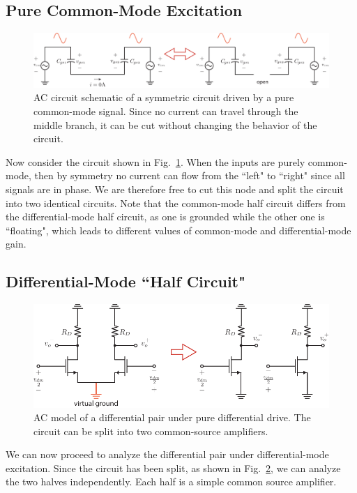 \subsection{Pure Common-Mode Excitation}
\begin{figure}[tb]
\centering
\includegraphics[width=\columnwidth]{CM_model.pdf}
\caption{AC circuit schematic of a symmetric circuit driven by a pure common-mode signal.  Since no current can travel through the middle branch, it can be cut without changing the behavior of the circuit.}
\label{fig:CM_model.pdf}
\end{figure}
Now consider the circuit shown in Fig.~\ref{fig:CM_model.pdf}.  When the inputs are purely common-mode, then by symmetry no current can flow from the ``left" to ``right" since all signals are in phase.  We are therefore free to cut this node and split the circuit into two identical circuits.  Note that the common-mode half circuit differs from the differential-mode half circuit, as one is grounded while the other one is ``floating", which leads to different values of common-mode and differential-mode gain.
\subsection{Differential-Mode ``Half Circuit"}
\begin{figure}[tb]
\centering
\includegraphics[scale=1]{Diff_Pair_DM_Drive.pdf}
\caption{AC model of a differential pair under pure differential drive.   The circuit can be split into two common-source amplifiers.}
\label{fig:Diff_Pair_DM_Drive.pdf}
\end{figure}
We can now proceed to analyze the differential pair under differential-mode excitation.  Since the circuit has been split, as shown in Fig.~\ref{fig:Diff_Pair_DM_Drive.pdf}, we can analyze the two halves independently.  Each half is a simple common source amplifier.
